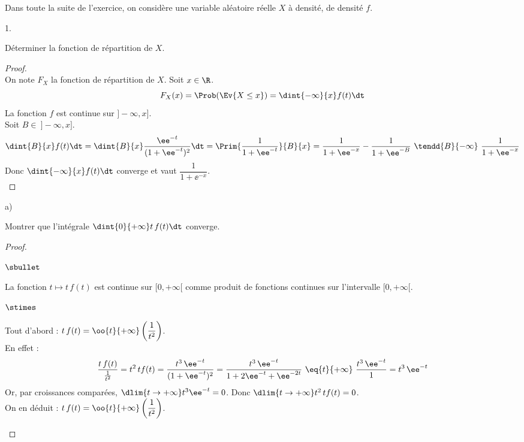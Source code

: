 \noindent
Dans toute la suite de l'exercice, on considère une variable aléatoire 
réelle $X$ à densité, de densité $f$.
\begin{noliste}{1.}
\setlength{\itemsep}{2mm}
\setcounter{enumi}{2}
\item Déterminer la fonction de répartition de $X$.

\begin{proof}~\\
 On note $F_X$ la fonction de répartition de $X$. Soit $x\in\R$.
 \[
  F_X(x) = \Prob(\Ev{X\leq x}) = \dint{-\infty}{x} f(t)\dt
 \]
 La fonction $f$ est continue sur $]-\infty, x]$.\\
 Soit $B \in \ ]-\infty, x]$.
 \[
  \dint{B}{x} f(t)\dt = \dint{B}{x} \dfrac{\ee^{-t}}{(1+\ee^{-t})^2}
  \dt = \Prim{\dfrac{1}{1+\ee^{-t}}}{B}{x} = 
  \dfrac{1}{1+\ee^{-x}} - \dfrac{1}{1+\ee^{-B}} \ \tendd{B}{-\infty} \
  \dfrac{1}{1+\ee^{-x}}
 \]
 Donc $\dint{-\infty}{x}f(t)\dt$ converge et vaut
 $\dfrac{1}{1+\ee^{-x}}$.
 ~\\[-1cm]
\end{proof}


\item
\begin{noliste}{a)}
\item Montrer que l'intégrale $\dint{0}{+\infty}t \, f(t)\dt$ 
converge.

\begin{proof}~
 \begin{noliste}{$\sbullet$}
 \item La fonction $t\mapsto t\, f(t)$ est continue sur $[0,+\infty[$
   comme produit de fonctions continues sur l'intervalle
   $[0,+\infty[$.
  
\item
  \begin{noliste}{$\stimes$}
  \item Tout d'abord : $t\, f(t) = \oo{t}{+\infty}
    \left(\dfrac{1}{t^2}\right)$.\\
    En effet : 
    \[
    \dfrac{t\, f(t)}{\frac{1}{t^2}} = t^2 \, tf(t) 
    = \dfrac{t^3 \, \ee^{-t}}{(1+\ee^{-t})^2} = 
    \dfrac{t^3\, \ee^{-t}}{1+2\ee^{-t}+\ee^{-2t}}
    \ \eq{t}{+\infty} \ \dfrac{t^3 \, \ee^{-t}}{1} = t^3\, \ee^{-t}
    \]
    Or, par croissances comparées, $\dlim{t\to+\infty} t^3\ee^{-t}=0$.
    Donc $\dlim{t\to+\infty} t^2 \, tf(t)=0$.\\[.2cm]
    On en déduit : $t\, f(t) = \oo{t}{+\infty}
    \left(\dfrac{1}{t^2}\right)$.


\end{noliste}
\end{noliste}
\end{proof}
\end{noliste}
\end{noliste}
